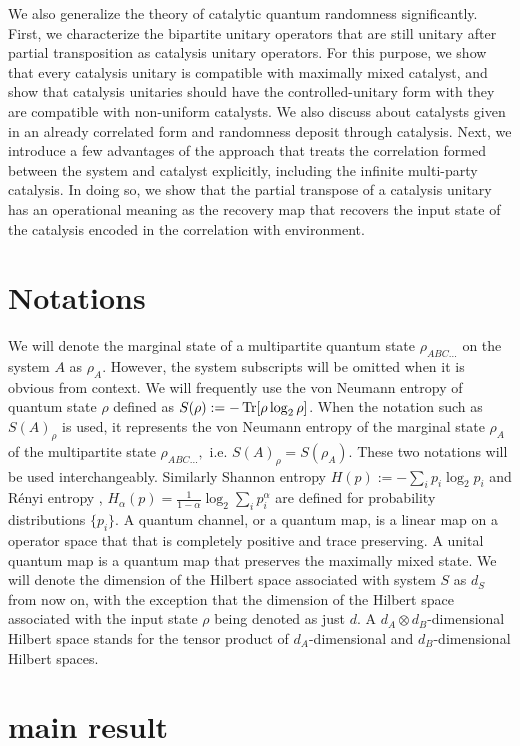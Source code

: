 \documentclass[aps, reprint, amsmath,amssymb, prx, superscriptaddress]{revtex4-2}
\begin{document}
We also generalize the theory of catalytic quantum randomness significantly. First, we characterize the bipartite unitary operators that are still unitary after partial transposition as catalysis unitary operators. For this purpose, we show that every catalysis unitary is compatible with maximally mixed catalyst, and show that catalysis unitaries should have the controlled-unitary form with they are compatible with non-uniform catalysts. We also discuss about catalysts given in an already correlated form and randomness deposit through catalysis. Next, we introduce a few advantages of the approach that treats the correlation formed between the system and catalyst explicitly, including the infinite multi-party catalysis. In doing so, we show that the partial transpose of a catalysis unitary has an operational meaning as the recovery map that recovers the input state of the catalysis encoded in the correlation with environment.

\section{Notations} \label{sec:notations}
We will denote the marginal state of a multipartite quantum state $\rho_{ABC\dots}$ on the system $A$ as $\rho_A$. However, the system subscripts will be omitted when it is obvious from context. We will frequently use the von Neumann entropy of quantum state $\rho$ defined as $S(\rho):=-\Tr[\rho\log_2 \rho]$. When the notation such as $S(A)_\rho$ is used, it represents the von Neumann entropy of the marginal state $\rho_A$ of the multipartite state $\rho_{ABC\dots},$ i.e. $S(A)_\rho=S(\rho_A)$. These two notations will be used interchangeably. Similarly Shannon entropy $H(p):=-\sum_i p_i \log_2  p_i$ and R\'{e}nyi entropy \cite{renyi1961measures}, $H_\alpha(p)=\frac{1}{1-\alpha}\log_2 \sum_i p_i^\alpha$ are defined for probability distributions $\{p_i\}$. A quantum channel, or a quantum map, is a linear map on a operator space that that is completely positive and trace preserving. A unital quantum map is a quantum map that preserves the maximally mixed state. We will denote the dimension of the Hilbert space associated with system $S$ as $d_S$ from now on, with the exception that the dimension of the Hilbert space associated with the input state $\rho$ being denoted as just $d$. A $d_A \otimes d_B$-dimensional Hilbert space stands for the tensor product of $d_A$-dimensional and $d_B$-dimensional Hilbert spaces.

\section{main result}
\end{document}
